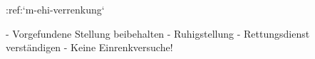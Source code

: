 :ref:`m-ehi-verrenkung`
\begin{itemize}
    -   Vorgefundene Stellung beibehalten
    -   Ruhigstellung
    -   Rettungsdienst verständigen
    -   Keine Einrenkversuche!
\end{itemize}